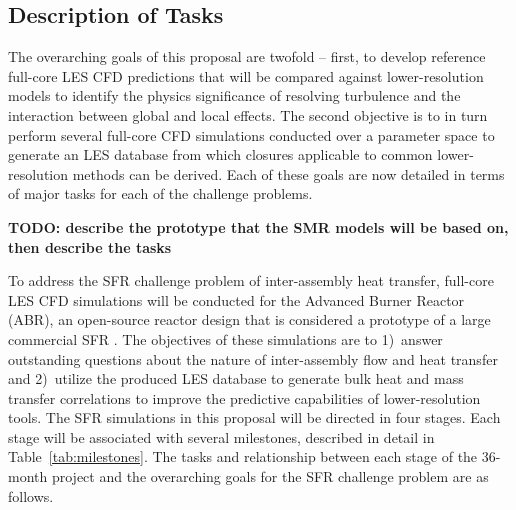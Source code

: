 \vspace{-.25in}
\subsection{Description of Tasks}
\vspace{-.2in}


The overarching goals of this proposal are twofold -- first, to develop
reference full-core LES CFD predictions that will be compared against
lower-resolution models to identify the physics significance of resolving
turbulence and the interaction between global and local effects. The second
objective is to in turn perform several full-core CFD simulations conducted
over a parameter space to generate an LES database from which closures
applicable to common lower-resolution methods can be derived. Each of these
goals are now detailed in terms of major tasks for each of the challenge
problems.

{\bf TODO: describe the prototype that the SMR models will be based on, then
describe the tasks}

To address the SFR challenge problem of inter-assembly heat transfer, full-core
LES CFD simulations will be conducted for the Advanced Burner Reactor (ABR), an
open-source reactor design that is considered a prototype of a large commercial
SFR \cite{abr}. The objectives of these simulations are to 1)~answer
outstanding questions about the nature of inter-assembly flow and heat transfer
and 2)~utilize the produced LES database to generate bulk heat and mass
transfer correlations to improve the predictive capabilities of
lower-resolution tools. The SFR simulations in this proposal will be directed
in four stages. Each stage will be associated with several milestones,
described in detail in Table~\ref{tab:milestones}. The tasks and relationship
between each stage of the 36-month project and the overarching goals for the
SFR challenge problem are as follows.

